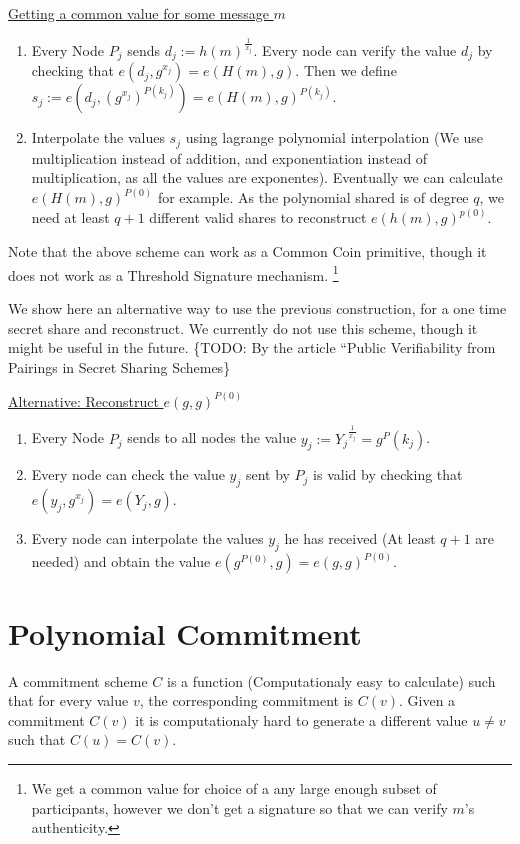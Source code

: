 \uline{Getting a common value for some message $m$}
\begin{enumerate}
  \item Every Node $P_j$ sends $d_j := {h(m)}^{\frac{1}{x_j}}$. Every node can
    verify the value $d_j$ by checking that $e(d_j,g^{x_j}) = e(H(m),g)$. Then
    we define $s_j := e(d_j,\left(g^{x_j}\right)^{P(k_j)}) = e(H(m),g)^{P(k_j)}$.
  \item Interpolate the values $s_j$ using lagrange polynomial interpolation (We
    use multiplication instead of addition, and exponentiation instead of
    multiplication, as all the values are exponentes). Eventually we can
    calculate ${e(H(m),g)}^{P(0)}$ for example. As the polynomial shared is of
    degree $q$, we need at least $q+1$ different valid shares to reconstruct
    ${e(h(m),g)}^{p(0)}$.
\end{enumerate}

Note that the above scheme can work as a Common Coin primitive, though it does
not work as a Threshold Signature mechanism. \footnote{We get a common value for
choice of a any large enough subset of participants, however we don't get a
signature so that we can verify $m$'s authenticity.}

We show here an alternative way to use the previous construction, for a one time
secret share and reconstruct. We currently do not use this scheme, though it
might be useful in the future. \{TODO: By the article ``Public Verifiability
from Pairings in Secret Sharing Schemes\}

\uline{Alternative: Reconstruct ${e(g,g)}^{P(0)}$}
\begin{enumerate}
  \item Every Node $P_j$ sends to all nodes the value $y_j :=
    {Y_j}^{\frac{1}{x_j}} = g^P(k_j)$.
  \item Every node can check the value $y_j$ sent by $P_j$ is valid by checking
    that $e(y_j,g^{x_j}) = e(Y_j,g)$.
  \item Every node can interpolate the values $y_j$ he has received (At least
    $q+1$ are needed) and obtain the value $e(g^{P(0)},g) = {e(g,g)}^{P(0)}$.
\end{enumerate}

\section{Polynomial Commitment}

A commitment scheme $C$ is a function (Computationaly easy to calculate) such
that for every value $v$, the corresponding commitment is $C(v)$. Given a
commitment $C(v)$ it is computationaly hard to generate a different value $u
\neq v$ such that $C(u) = C(v)$.

